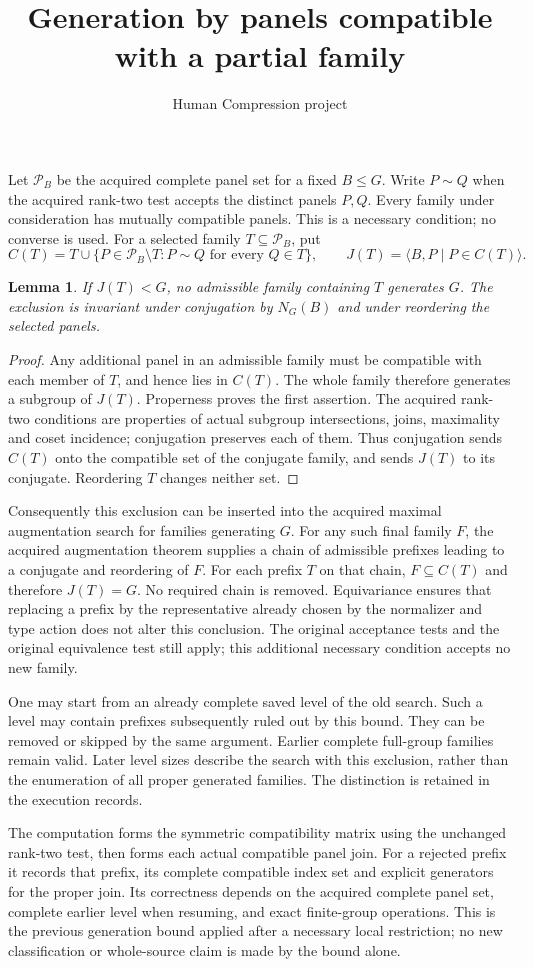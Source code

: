 \documentclass[11pt]{article}
\title{Generation by panels compatible with a partial family}
\author{Human Compression project}\date{}
\newtheorem{lemma}{Lemma}
\begin{document}
\maketitle
Let $\mathcal P_B$ be the acquired complete panel set for a fixed
$B\leq G$. Write $P\sim Q$ when the acquired rank-two test accepts the
distinct panels $P,Q$. Every family under consideration has mutually
compatible panels. This is a necessary condition; no converse is used.
For a selected family $T\subseteq\mathcal P_B$, put
\[
 C(T)=T\cup\{P\in\mathcal P_B\setminus T:
                 P\sim Q\text{ for every }Q\in T\},
 \qquad J(T)=\langle B,P\mid P\in C(T)\rangle.
\]
\begin{lemma}
If $J(T)<G$, no admissible family containing $T$ generates $G$.
The exclusion is invariant under conjugation by $N_G(B)$ and under
reordering the selected panels.
\end{lemma}
\begin{proof}
Any additional panel in an admissible family must be compatible with
each member of $T$, and hence lies in $C(T)$. The whole family therefore
generates a subgroup of $J(T)$. Properness proves the first assertion.
The acquired rank-two conditions are properties of actual subgroup
intersections, joins, maximality and coset incidence; conjugation
preserves each of them. Thus conjugation sends $C(T)$ onto the
compatible set of the conjugate family, and sends $J(T)$ to its
conjugate. Reordering $T$ changes neither set.
\end{proof}

Consequently this exclusion can be inserted into the acquired maximal
augmentation search for families generating $G$. For any such final
family $F$, the acquired augmentation theorem supplies a chain of
admissible prefixes leading to a conjugate and reordering of $F$.
For each prefix $T$ on that chain, $F\subseteq C(T)$ and therefore
$J(T)=G$. No required chain is removed. Equivariance ensures that
replacing a prefix by the representative already chosen by the
normalizer and type action does not alter this conclusion. The
original acceptance tests and the original equivalence test still
apply; this additional necessary condition accepts no new family.

One may start from an already complete saved level of the old search.
Such a level may contain prefixes subsequently ruled out by this bound.
They can be removed or skipped by the same argument. Earlier complete
full-group families remain valid. Later level sizes describe the search
with this exclusion, rather than the enumeration of all proper generated
families. The distinction is retained in the execution records.

The computation forms the symmetric compatibility matrix using the
unchanged rank-two test, then forms each actual compatible panel join.
For a rejected prefix it records that prefix, its complete compatible
index set and explicit generators for the proper join. Its correctness
depends on the acquired complete panel set, complete earlier level when
resuming, and exact finite-group operations. This is the previous
generation bound applied after a necessary local restriction; no new
classification or whole-source claim is made by the bound alone.
\end{document}
